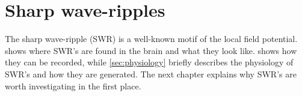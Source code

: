 \chapter{Sharp wave-ripples}
\label{ch:SWR}

The sharp wave-ripple (SWR) is a well-known motif of the local field potential.  shows where SWR's are found in the brain and what they look like.  shows how they can be recorded, while \cref{sec:physiology} briefly describes the physiology of SWR's and how they are generated. The next chapter explains why SWR's are worth investigating in the first place.




